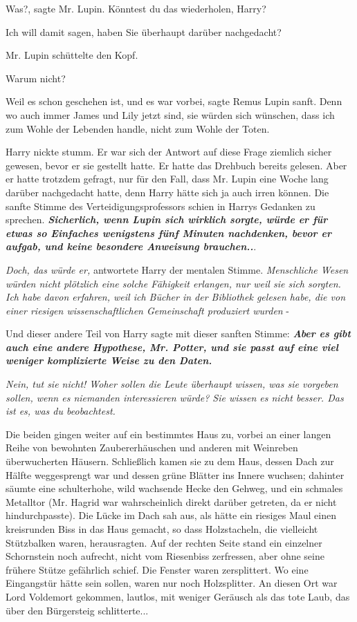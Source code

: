 \glqq Was?\grqq{}, sagte Mr. Lupin. \glqq Könntest du das wiederholen,
Harry?\grqq{}

\glqq Ich will damit sagen, haben Sie überhaupt darüber nachgedacht?\grqq{}

Mr. Lupin schüttelte den Kopf.

\glqq Warum nicht?\grqq{}

\glqq Weil es schon geschehen ist, und es war vorbei\grqq{}, sagte Remus Lupin
sanft. \glqq Denn wo auch immer James und Lily jetzt sind, sie würden sich
wünschen, dass ich zum Wohle der Lebenden handle, nicht zum Wohle der
Toten.\grqq{}

Harry nickte stumm. Er war sich der Antwort auf diese Frage ziemlich sicher
gewesen, bevor er sie gestellt hatte. Er hatte das Drehbuch bereits gelesen.
Aber er hatte trotzdem gefragt, nur für den Fall, dass Mr. Lupin eine Woche lang
darüber nachgedacht hatte, denn Harry hätte sich ja auch irren können. Die
sanfte Stimme des Verteidigungsprofessors schien in Harrys Gedanken zu sprechen.
\textbf{\emph{Sicherlich, wenn Lupin sich wirklich sorgte, würde er für etwas so
Einfaches wenigstens fünf Minuten nachdenken, bevor er aufgab, und keine
besondere Anweisung brauchen..}}.

\emph{Doch, das würde er,} antwortete Harry der mentalen Stimme.
\emph{Menschliche Wesen würden nicht plötzlich eine solche Fähigkeit erlangen,
nur weil sie sich sorgten. Ich habe davon erfahren, weil ich Bücher in der
Bibliothek gelesen habe, die von einer riesigen wissenschaftlichen Gemeinschaft
produziert wurden }-

Und dieser andere Teil von Harry sagte mit dieser sanften Stimme:
\textbf{\emph{Aber es gibt auch eine andere Hypothese, Mr. Potter, und sie passt
auf eine viel weniger komplizierte Weise zu den Daten.}}

\emph{Nein, tut sie nicht! Woher sollen die Leute überhaupt wissen, was sie vorgeben sollen, wenn es niemanden interessieren würde? Sie wissen es nicht besser. Das ist es, was du beobachtest. }

Die beiden gingen weiter auf ein bestimmtes Haus zu, vorbei an einer langen
Reihe von bewohnten Zaubererhäuschen und anderen mit Weinreben überwucherten
Häusern. Schließlich kamen sie zu dem Haus, dessen Dach zur Hälfte weggesprengt
war und dessen grüne Blätter ins Innere wuchsen; dahinter säumte eine
schulterhohe, wild wachsende Hecke den Gehweg, und ein schmales Metalltor (Mr.
Hagrid war wahrscheinlich direkt darüber getreten, da er nicht hindurchpasste).
Die Lücke im Dach sah aus, als hätte ein riesiges Maul einen kreisrunden Biss in
das Haus gemacht, so dass Holzstacheln, die vielleicht Stützbalken waren,
herausragten. Auf der rechten Seite stand ein einzelner Schornstein noch
aufrecht, nicht vom Riesenbiss zerfressen, aber ohne seine frühere Stütze
gefährlich schief. Die Fenster waren zersplittert. Wo eine Eingangstür hätte
sein sollen, waren nur noch Holzsplitter. An diesen Ort war Lord Voldemort
gekommen, lautlos, mit weniger Geräusch als das tote Laub, das über den
Bürgersteig schlitterte...

